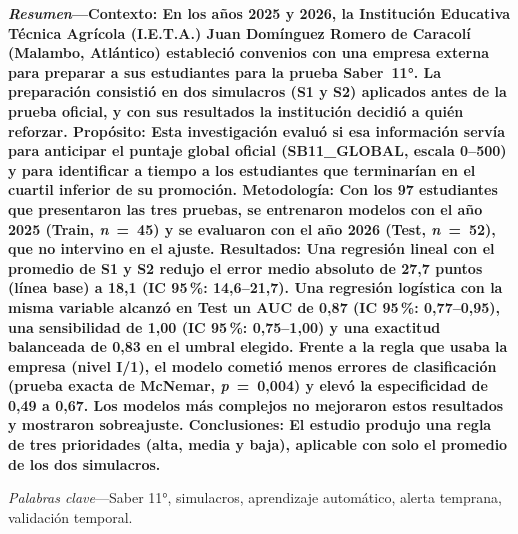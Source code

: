 \documentclass[10pt,letterpaper,twocolumn]{article}
\begin{document}
{\fontsize{9}{10.5}\selectfont\bfseries
\noindent\textit{Resumen}---Contexto: En los años 2025 y 2026, la Institución Educativa Técnica Agrícola (I.E.T.A.) Juan Domínguez Romero de Caracolí (Malambo, Atlántico) estableció convenios con una empresa externa para preparar a sus estudiantes para la prueba Saber~11°. La preparación consistió en dos simulacros (S1 y S2) aplicados antes de la prueba oficial, y con sus resultados la institución decidió a quién reforzar. Propósito: Esta investigación evaluó si esa información servía para anticipar el puntaje global oficial (SB11\_GLOBAL, escala 0--500) y para identificar a tiempo a los estudiantes que terminarían en el cuartil inferior de su promoción. Metodología: Con los 97 estudiantes que presentaron las tres pruebas, se entrenaron modelos con el año 2025 (Train, \textit{n}~=~45) y se evaluaron con el año 2026 (Test, \textit{n}~=~52), que no intervino en el ajuste. Resultados: Una regresión lineal con el promedio de S1 y S2 redujo el error medio absoluto de 27,7 puntos (línea base) a 18,1 (IC 95\,\%: 14,6--21,7). Una regresión logística con la misma variable alcanzó en Test un AUC de 0,87 (IC 95\,\%: 0,77--0,95), una sensibilidad de 1,00 (IC 95\,\%: 0,75--1,00) y una exactitud balanceada de 0,83 en el umbral elegido. Frente a la regla que usaba la empresa (nivel I/1), el modelo cometió menos errores de clasificación (prueba exacta de McNemar, \textit{p}~=~0,004) y elevó la especificidad de 0,49 a 0,67. Los modelos más complejos no mejoraron estos resultados y mostraron sobreajuste. Conclusiones: El estudio produjo una regla de tres prioridades (alta, media y baja), aplicable con solo el promedio de los dos simulacros.

\textit{Palabras clave}---Saber 11°, simulacros, aprendizaje automático, alerta temprana, validación temporal.

}
\end{document}

